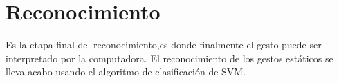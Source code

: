 \section{Reconocimiento}\label{sec:ReconocimientoSystem}

Es la etapa final del reconocimiento,es donde finalmente el gesto puede ser interpretado por la computadora.   
El reconocimiento de los gestos estáticos se lleva acabo usando el algoritmo de clasificación de SVM. 




%


%
%
%
%  
	
\newpage

